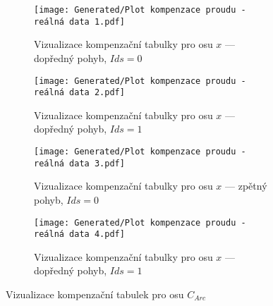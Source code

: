 \begin{landscapeimagepage}
    \begin{figure}[H]
        \centering
        \begin{subfigure}{.5\textheight}
            \centering
            \texttt{[image: Generated/Plot kompenzace proudu - reálná data 1.pdf]}
            \caption{Vizualizace kompenzační tabulky pro osu $x$ --- dopředný pohyb, $Ids = 0$}
            \label{fig:kompenzace proudu reálná data 1}
        \end{subfigure}
        \vspace{0.5cm}
        \hspace{2.5cm}
        \begin{subfigure}{.5\textheight}
            \centering
            \texttt{[image: Generated/Plot kompenzace proudu - reálná data 2.pdf]}
            \caption{Vizualizace kompenzační tabulky pro osu $x$ --- dopředný pohyb, $Ids = 1$}
            \label{fig:kompenzace proudu reálná data 2}
        \end{subfigure}
        \vspace{0.5cm}
        \begin{subfigure}{.5\textheight}
            \centering
                    \texttt{[image: Generated/Plot kompenzace proudu - reálná data 3.pdf]}
                    \caption{Vizualizace kompenzační tabulky pro osu $x$ --- zpětný pohyb, $Ids = 0$}
                    \label{fig:kompenzace proudu reálná data 3}
        \end{subfigure}
        \hspace{2.5cm}
        \begin{subfigure}{.5\textheight}
                \centering
            \texttt{[image: Generated/Plot kompenzace proudu - reálná data 4.pdf]}
            \caption{Vizualizace kompenzační tabulky pro osu $x$ --- dopředný pohyb, $Ids = 1$}
            \label{fig:kompenzace proudu reálná data 4}
        \end{subfigure}
        \caption{Vizualizace kompenzační tabulek pro osu $C_{Arc}$}
        \label{fig: Vizualizace kompenzační tabulek pro osu CArc}
    \end{figure}
\end{landscapeimagepage}


